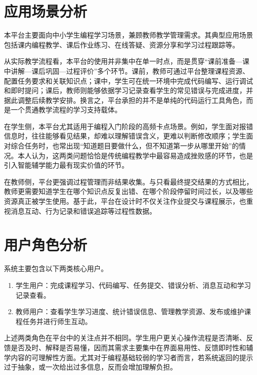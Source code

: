 \section{应用场景分析}\label{ux5e94ux7528ux573aux666fux5206ux6790}

本平台主要面向中小学生编程学习场景，兼顾教师教学管理需求。其典型应用场景包括课内编程教学、课后作业练习、在线答疑、资源分享和学习过程跟踪等。

从实际教学流程看，本平台的使用并非集中在单一时点，而是贯穿``课前准备---课中讲解---课后巩固---过程评价''多个环节。课前，教师可通过平台整理课程资源、配置任务要求和关联知识点；课中，学生可在统一环境中完成代码编写、运行调试和即时提问；课后，教师则能够依据学习记录查看学生的常见错误与完成进度，并据此调整后续教学安排。换言之，平台承担的并不是单纯的代码运行工具角色，而是一个贯通教学流程的学习支持载体。

在学生侧，本平台尤其适用于编程入门阶段的高频卡点场景。例如，学生面对报错信息时，往往能够看见结果，却难以理解错误含义，更难以判断修改顺序；学生面对综合任务时，也常出现``知道题目要做什么，但不知道第一步从哪里开始''的情况。本人认为，这两类问题恰恰是传统编程教学中最容易造成挫败感的环节，也是引入智能辅学能力最有现实价值的环节。

在教师侧，平台更强调过程管理而非结果收集。与只看最终提交结果的方式相比，教师更需要知道学生在哪个知识点反复出错、在哪个阶段停留时间过长，以及哪些资源真正被学生使用。基于此，平台在设计时不仅关注作业提交与课程展示，也重视消息互动、行为记录和错误追踪等过程性数据。

\section{用户角色分析}\label{ux7528ux6237ux89d2ux8272ux5206ux6790}

系统主要包含以下两类核心用户。

\begin{enumerate}
\def\labelenumi{(\arabic{enumii})}
\tightlist
\item
  学生用户：完成课程学习、代码编写、任务提交、错误分析、消息互动和学习记录查看。
\item
  教师用户：查看学生学习进度、统计错误信息、管理教学资源、发布或维护课程任务并进行师生互动。
\end{enumerate}

上述两类角色在平台中的关注点并不相同。学生用户更关心操作流程是否清晰、反馈是否及时、解释是否易懂，因而其需求主要集中在界面易用性、反馈即时性和辅学内容的可理解性方面。尤其对于编程基础较弱的学习者而言，若系统返回的提示过于抽象，或一次给出过多信息，反而会增加理解负担。

